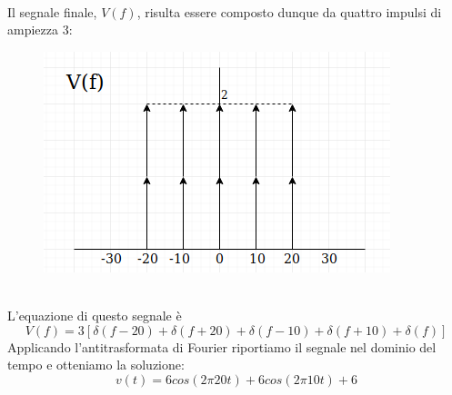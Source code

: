 \documentclass[12pt,a4paper]{article}
\begin{document}
	\\Il segnale finale, $V(f)$, risulta essere composto dunque da quattro impulsi di ampiezza 3:
	\begin{figure}[h!]
		\centering
		\includegraphics[scale=0.4]{./images/fourier54_8.png}
	\end{figure}
	\\L'equazione di questo segnale è 
	\[
		V(f) = 3\left[\delta(f-20) + \delta(f+20) + \delta(f-10) + \delta(f+10) + \delta(f)\right] 
	\]
	Applicando l'antitrasformata di Fourier riportiamo il segnale nel dominio del tempo e otteniamo la soluzione:
	\[
		v(t) = 6cos(2\pi 20t) + 6cos(2\pi 10t) + 6
	\]
	\newpage
\end{document}
